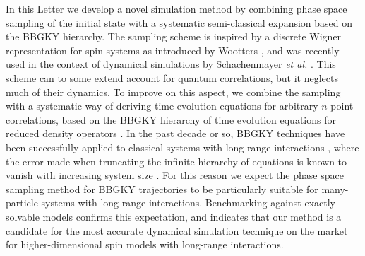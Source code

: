 \documentclass[aps,prl,showpacs,amsmath,amssymb,superscriptaddress,reprint,10pt]{revtex4-1}
\begin{document}
In this Letter we develop a novel simulation method by combining phase space sampling of the initial state with a systematic semi-classical expansion based on the BBGKY hierarchy. The sampling scheme is inspired by a discrete Wigner representation for spin systems as introduced by Wootters \cite{Wootters87}, and was recently used in the context of dynamical simulations by Schachenmayer {\em et al.} \cite{Schachenmayer_etal15}. This scheme can to some extend account for quantum correlations, but it neglects much of their dynamics. To improve on this aspect, we combine the sampling with a systematic way of deriving time evolution equations for arbitrary $n$-point correlations, based on the BBGKY hierarchy of time evolution equations for reduced density operators \cite{Bonitz}. In the past decade or so, BBGKY techniques have been successfully applied to classical systems with long-range interactions \cite{BouchetDauxois05,*Nardini_etal12}, where the error made when truncating the infinite hierarchy of equations 
is known to vanish with increasing system size \cite{BraunHepp77}. For this reason we expect the phase space sampling method for BBGKY trajectories to be particularly suitable for many-particle systems with long-range interactions. Benchmarking against exactly solvable models confirms this expectation, and indicates that our method is a candidate for the most accurate dynamical simulation technique on the market for higher-dimensional spin models with long-range interactions.
\end{document}
